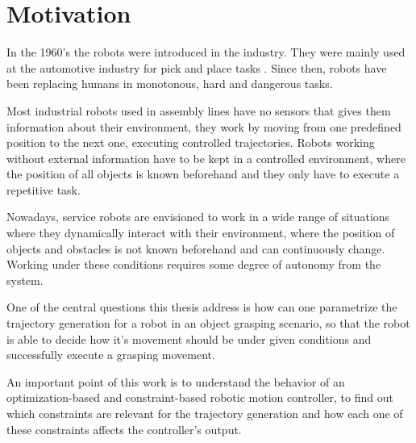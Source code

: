 \section{Motivation}
In the 1960's the robots were introduced in the industry. They were mainly used at the automotive industry for pick and place tasks  \citep{history}. Since then, robots have been replacing humans in monotonous, hard and dangerous tasks.

Most industrial robots used in assembly lines have no sensors that gives them information about their environment, they work by moving from one predefined position to the next one, executing controlled trajectories. Robots working without external information have to be kept in a controlled environment, where the position of all objects is known beforehand and they only have to execute a repetitive task.

Nowadays, service robots are envisioned to work in a wide range of situations where they dynamically interact with their environment, where the position of objects and obstacles is not known beforehand and can continuously change. Working under these conditions requires some degree of autonomy from the system.

One of the central questions this thesis address is how can one parametrize the trajectory generation for a robot in an object grasping scenario, so that the robot is able to decide how it's movement should be under given conditions and successfully execute a grasping movement.

An important point of this work is to understand the behavior of an optimization-based and constraint-based robotic motion controller, to find out which constraints are relevant for the trajectory generation and how each one of these constraints affects the controller's output.

